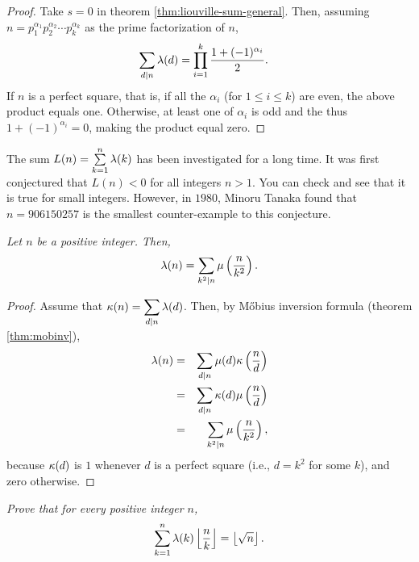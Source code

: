 \documentclass[12pt]{subfile}
\begin{document}
		\begin{proof}
			Take $s=0$ in theorem \eqref{thm:liouville-sum-general}. Then, assuming $n= p_1^{\alpha_1} p_2^{\alpha_2} \cdots p_k^{\alpha_k}$ as the prime factorization of $n$,
				\begin{align*}
					\sum_{d|n}\lambda (d) &= \prod_{i=1}^{k}\frac{1 + (-1)^{\alpha_i}}{2}.
				\end{align*}
			If $n$ is a perfect square, that is, if all the $\alpha_i$ (for $1 \leq i \leq k$) are even, the above product equals one. Otherwise, at least one of $\alpha_i$ is odd and the thus $1 + (-1)^{\alpha_i}=0$, making the product equal zero.
		\end{proof}
		
		\begin{remark}
			The sum $L(n)= \sum\limits_{k=1}^{n} \lambda (k)$ has been investigated for a long time. It was first conjectured that $L(n) <0$ for all integers $n >1$. You can check and see that it is true for small integers. However, in $1980$, Minoru Tanaka found that $n=906150257$ is the smallest counter-example to this conjecture. 
		\end{remark}
		\begin{theorem}\slshape
			Let $n$ be a positive integer. Then,
				\begin{align*}
					\lambda (n) = \sum_{k^2|n}  \mu \left(\frac{n}{k^2}\right).
				\end{align*}
		\end{theorem}
		
		\begin{proof}
			Assume that $\displaystyle \kappa(n)=\sum\limits_{d|n}\lambda(d)$. Then, by M\H obius inversion formula (theorem \eqref{thm:mobinv}),
				\begin{eqnarray*}
					\lambda(n) &=& \sum_{d|n}\mu(d)\kappa\left(\frac nd\right)\\
						  &=& \sum_{d|n}\kappa(d)\mu\left(\frac nd\right)\\
						  &=& \sum_{k^2|n}  \mu \left(\frac{n}{k^2}\right),
				\end{eqnarray*}
			because $\kappa(d)$ is $1$ whenever $d$ is a perfect square (i.e., $d=k^2$ for some $k$), and zero otherwise.
		\end{proof}
		
		\begin{theorem}\slshape\label{thm:liouville-square-floor}
			Prove that for every positive integer $n$,
				\begin{align*}
					\sum_{k=1}^{n} \lambda (k) \left\lfloor \frac{n}{k}\right\rfloor = \left\lfloor \sqrt n\right \rfloor.
				\end{align*}
		\end{theorem}
		
\end{document}

